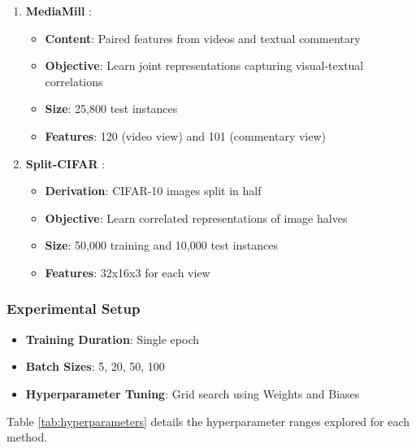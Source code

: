 \begin{enumerate}
    \item \textbf{MediaMill} \citep{gemert2008visual}:
        \begin{itemize}
            \item \textbf{Content}: Paired features from videos and textual commentary
            \item \textbf{Objective}: Learn joint representations capturing visual-textual correlations
            \item \textbf{Size}: 25,800 test instances
            \item \textbf{Features}: 120 (video view) and 101 (commentary view)
        \end{itemize}
    
    \item \textbf{Split-CIFAR} \citep{meng2021online}:
        \begin{itemize}
            \item \textbf{Derivation}: CIFAR-10 images split in half
            \item \textbf{Objective}: Learn correlated representations of image halves
            \item \textbf{Size}: 50,000 training and 10,000 test instances
            \item \textbf{Features}: 32x16x3 for each view
        \end{itemize}
\end{enumerate}

\subsubsection{Experimental Setup}
\begin{itemize}
    \item \textbf{Training Duration}: Single epoch
    \item \textbf{Batch Sizes}: 5, 20, 50, 100
    \item \textbf{Hyperparameter Tuning}: Grid search using Weights and Biases \citep{wandb}
\end{itemize}

Table \ref{tab:hyperparameters} details the hyperparameter ranges explored for each method.

